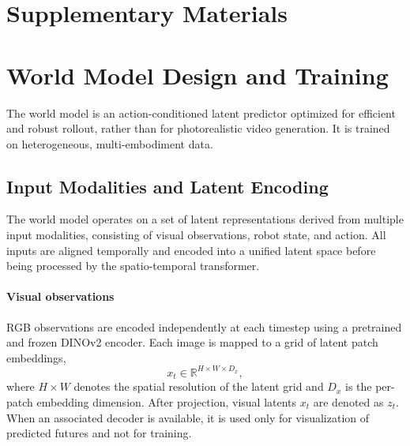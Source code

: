 \section*{Supplementary Materials}

\section{World Model Design and Training}
\label{sec:supp-world-model}

The world model is an action-conditioned latent predictor optimized for efficient and robust rollout, rather than for photorealistic video generation. It is trained on heterogeneous, multi-embodiment data.



\subsection{Input Modalities and Latent Encoding}
\label{sec:supp-encoding}

The world model operates on a set of latent representations derived from multiple input modalities, consisting of visual observations, robot state, and action. All inputs are aligned temporally and encoded into a unified latent space before being processed by the spatio-temporal transformer.

\paragraph{Visual observations}
RGB observations are encoded independently at each timestep using a pretrained and frozen DINOv2 encoder. Each image is mapped to a grid of latent patch embeddings,
\[
x_t \in \mathbb{R}^{H \times W \times D_x},
\]
where $H \times W$ denotes the spatial resolution of the latent grid and $D_x$ is the per-patch embedding dimension. After projection, visual latents $x_t$ are denoted as $z_t$. When an associated decoder is available, it is used only for visualization of predicted futures and not for training.

